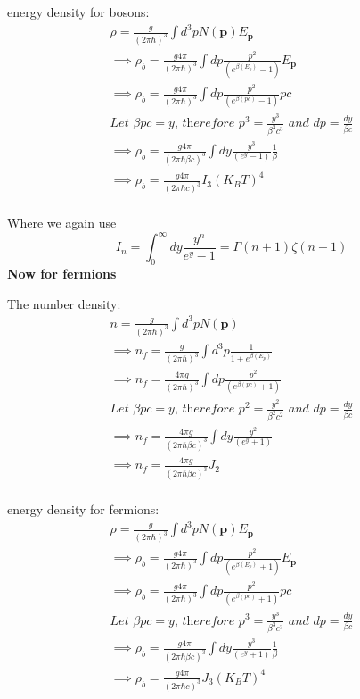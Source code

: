 \documentclass[12pt]{report}
\newcommand{\mbf}[1]{\mathbf{#1}}
\newcommand{\tbf}[1]{\textbf{#1}}
\newcommand{\tit}[1]{\textit{#1}}
\begin{document}
energy density for bosons:
\begin{eqnarray*}
\rho = \frac{g}{(2 \pi \hbar)^3} \int d^3p N(\mbf{p})E_{\mbf{p}}\\
\implies \rho_b = \frac{g 4 \pi}{(2 \pi \hbar)^3} \int dp \frac{    p^2}{(e^{\beta(E_p)} - 1)} E_{\mbf{p}}\\
\implies \rho_b = \frac{g 4 \pi}{(2 \pi \hbar)^3} \int dp \frac{    p^2}{(e^{\beta(pc)} - 1)} pc\\
\tit{Let $\beta pc = y$, therefore $p^3=\frac{y^3}{\beta^3 c^3}$ and $dp=\frac{dy}{\beta c}$}\\
\implies \rho_b = \frac{g 4 \pi}{(2 \pi \hbar \beta c)^3} \int dy \frac{    y^3}{(e^{y} - 1)} \frac{1}{\beta}\\
\implies \rho_b = \frac{g 4 \pi}{(2 \pi \hbar c)^3} I_3 (K_B T)^4\\
\end{eqnarray*}

Where we again use 
\begin{equation}
I_n=\int^\infty_0 dy \frac{y^n}{e^y - 1}= \Gamma(n+1)\zeta(n+1)
\end{equation}
 \tbf{Now for fermions}
 
 The number density:
 \begin{eqnarray*}
n= \frac{g }{(2 \pi \hbar)^3} \int d^3p N(\mbf{p})\\
\implies n_{f}= \frac{g }{(2 \pi \hbar)^3} \int d^3p \frac{1}{1 + e^{\beta(E_p)}}\\
\implies n_{f}= \frac{ 4 \pi g}{(2 \pi \hbar)^3} \int dp \frac{    p^2}{(e^{\beta(pc)} + 1)}\\
\tit{Let $\beta pc = y$, therefore $p^2=\frac{y^2}{\beta^2 c^2}$ and $dp=\frac{dy}{\beta c}$}\\
\implies n_{f}= \frac{ 4 \pi g}{(2 \pi \hbar \beta c)^3 } \int dy \frac{    y^2}{(e^{y} + 1)}\\
\implies n_{f}= \frac{ 4 \pi g}{(2 \pi \hbar \beta c)^3 } J_2\\
\end{eqnarray*}

energy density for fermions:
\begin{eqnarray*}
\rho = \frac{g}{(2 \pi \hbar)^3} \int d^3p N(\mbf{p})E_{\mbf{p}}\\
\implies \rho_b = \frac{g 4 \pi}{(2 \pi \hbar)^3} \int dp \frac{    p^2}{(e^{\beta(E_p)} + 1)} E_{\mbf{p}}\\
\implies \rho_b = \frac{g 4 \pi}{(2 \pi \hbar)^3} \int dp \frac{    p^2}{(e^{\beta(pc)} + 1)} pc\\
\tit{Let $\beta pc = y$, therefore $p^3=\frac{y^3}{\beta^3 c^3}$ and $dp=\frac{dy}{\beta c}$}\\
\implies \rho_b = \frac{g 4 \pi}{(2 \pi \hbar \beta c)^3} \int dy \frac{    y^3}{(e^{y} + 1)} \frac{1}{\beta}\\
\implies \rho_b = \frac{g 4 \pi}{(2 \pi \hbar c)^3} J_3 (K_B T)^4\\
\end{eqnarray*}
\end{document}
